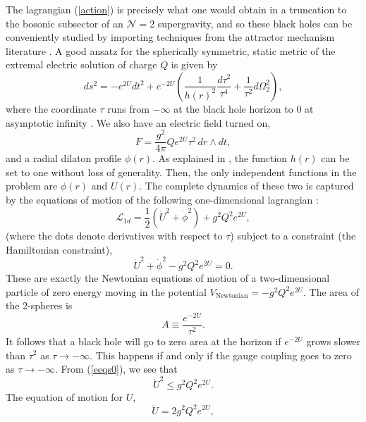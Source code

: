\documentclass[11pt]{article}
\numberwithin{equation}{section}
\newcommand{\eq}[1]{(\ref{#1})}
\newcommand{\beq}{\begin{equation}}  \newcommand{\eeq}{\end{equation}}
\numberwithin{equation}{section}
\theoremstyle{remark}
\begin{document}
The lagrangian \eq{action} is precisely what one would obtain in a truncation to the bosonic subsector of an $\mathcal{N}=2$ supergravity, and so these black holes can be conveniently studied by importing techniques from the attractor mechanism literature \cite{Gibbons:1996af,Denef:1998sv,DallAgata:2010ejj}.
A good ansatz for the spherically symmetric, static metric of the extremal electric solution of charge $Q$  is given by \cite{Denef:1998sv}
\beq
ds^2=-e^{2U}dt^2+e^{-2U}\left(\frac{1}{h(r)^2}\frac{d\tau^2}{\tau^4}+\frac{1}{\tau^2}d\Omega_2^2\right),
\eeq
where the coordinate $\tau$ runs from $-\infty$ at the black hole horizon to $0$ at asymptotic infinity \cite{Gibbons:1996af}. We also have an electric field turned on,
\begin{equation} F=\frac{g^2}{4\pi} Q e^{2U}\tau^2\, dr\wedge dt,\label{efield}\end{equation}
and a radial dilaton profile $\phi(r)$. As explained in \cite{Denef:1998sv}, the function $h(r)$ can be set to one without loss of generality. Then, the only independent functions in the problem are $\phi(r)$ and $U(r)$. The complete dynamics of these two is captured by the equations of motion of the following one-dimensional lagrangian \cite{Gibbons:1996af,Denef:1998sv}:
\begin{equation}\mathcal{L}_{1d}=\frac12\left(\dot{U}^2+\dot{\phi}^2\right)+g^2Q^2e^{2U},\end{equation}
(where the dots denote derivatives with respect to $\tau$) subject to a constraint (the Hamiltonian constraint),
\begin{equation}\dot{U}^2+\dot{\phi}^2-g^2Q^2e^{2U}=0.\label{eeqs0}\end{equation}
These are exactly the Newtonian equations of motion of a two-dimensional particle of zero energy moving in the potential $V_{\text{Newtonian}}=-g^2Q^2 e^{2U}$. The area of the 2-spheres is
\begin{equation} A\equiv \frac{e^{-2U}}{\tau^2}.\end{equation}
It follows that a black hole will go to zero area at the horizon if $e^{-2U}$ grows slower than $\tau^2$ as $\tau\rightarrow-\infty$. This happens if and only if the gauge coupling goes to zero as $\tau\rightarrow-\infty$. From \eq{eeqs0}, we see that
\begin{equation}\dot{U}^2\leq g^2 Q^2 e^{2U}.\label{e32455}\end{equation}
The equation of motion for $U$,
\begin{equation}\ddot{U}=2g^2 Q^2e^{2U},\label{emoU}\end{equation}
\end{document}

